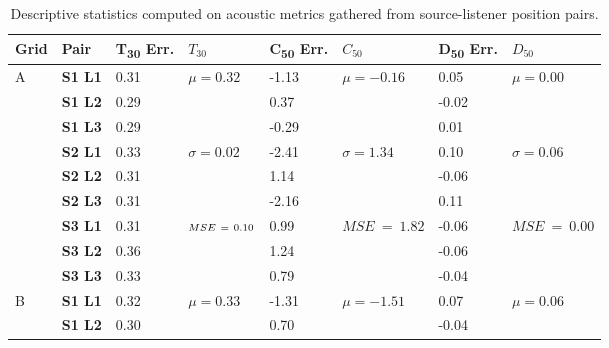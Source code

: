 \begin{table}[htbp]
    \centering
    \caption[Ray tracing testing --- acoustic metrics descriptive statistics]{Descriptive statistics computed on acoustic metrics gathered from source-listener position pairs.}\label{tab:rt-metrics-stats}
    \begin{tabular}{@{}llllllll@{}}
    \toprule
    Grid & Pair & T\textsubscript{30} Err. & $T_{30}$ & C\textsubscript{50} Err. & $C_{50}$ & D\textsubscript{50} Err. &  $D_{50}$ \\ \midrule
        \multirow{9}{*}{A}  & \textbf{S1 L1} & 0.31  & \multirow{3}{*}{$\mu = 0.32$} & -1.13 & \multirow{3}{*}{$\mu = -0.16$} & 0.05  & \multirow{3}{*}{$\mu = 0.00$} \\
           & \textbf{S1 L2} & 0.29 &                       & 0.37  &                        & -0.02 &                       \\
           & \textbf{S1 L3} & 0.29 &                       & -0.29 &                        & 0.01  &                       \\
           & \textbf{S2 L1} & 0.33 & \multirow{3}{*}{$\sigma = 0.02$} & -2.41 & \multirow{3}{*}{$\sigma = 1.34$}  & 0.10  & \multirow{3}{*}{$\sigma = 0.06$} \\
           & \textbf{S2 L2} & 0.31 &                       & 1.14  &                        & -0.06 &                       \\
           & \textbf{S2 L3} & 0.31 &                       & -2.16 &                        & 0.11  &                       \\
           & \textbf{S3 L1} & 0.31 & \multirow{3}{*}{$\scriptstyle{MSE}~=~\normalsize{0.10}$} & 0.99  & \multirow{3}{*}{$\scriptstyle{MSE}~=~1.82$}  & -0.06 & \multirow{3}{*}{$\scriptstyle{MSE}~=~0.00$} \\
           & \textbf{S3 L2} & 0.36 &                       & 1.24  &                        & -0.06 &                       \\
           & \textbf{S3 L3} & 0.33 &                       & 0.79  &                        & -0.04 &                       \\ \cmidrule(l){1-8}
        \multirow{9}{*}{B}& \textbf{S1 L1} & 0.32 & \multirow{3}{*}{$\mu = 0.33$} & -1.31 & \multirow{3}{*}{$\mu = -1.51$} & 0.07  & \multirow{3}{*}{$\mu = 0.06$} \\ 
           & \textbf{S1 L2} & 0.30 &                       & 0.70  &                        & -0.04 &                       \\

\end{tabular}
\end{table}
